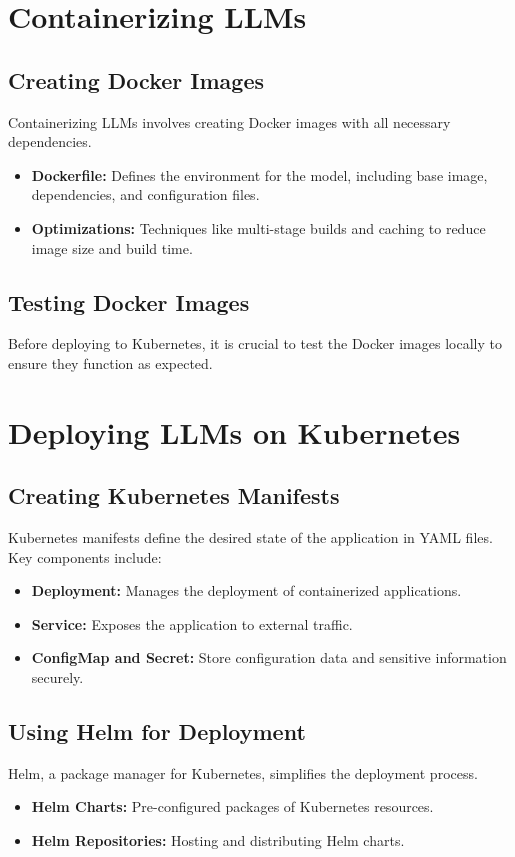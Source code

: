 \section{Containerizing LLMs}

\subsection{Creating Docker Images}
Containerizing LLMs involves creating Docker images with all necessary dependencies.
\begin{itemize}
    \item \textbf{Dockerfile:} Defines the environment for the model, including base image, dependencies, and configuration files.
    \item \textbf{Optimizations:} Techniques like multi-stage builds and caching to reduce image size and build time.
\end{itemize}

\subsection{Testing Docker Images}
Before deploying to Kubernetes, it is crucial to test the Docker images locally to ensure they function as expected.

\section{Deploying LLMs on Kubernetes}

\subsection{Creating Kubernetes Manifests}
Kubernetes manifests define the desired state of the application in YAML files. Key components include:
\begin{itemize}
    \item \textbf{Deployment:} Manages the deployment of containerized applications.
    \item \textbf{Service:} Exposes the application to external traffic.
    \item \textbf{ConfigMap and Secret:} Store configuration data and sensitive information securely.
\end{itemize}

\subsection{Using Helm for Deployment}
Helm, a package manager for Kubernetes, simplifies the deployment process.
\begin{itemize}
    \item \textbf{Helm Charts:} Pre-configured packages of Kubernetes resources.
    \item \textbf{Helm Repositories:} Hosting and distributing Helm charts.
\end{itemize}

